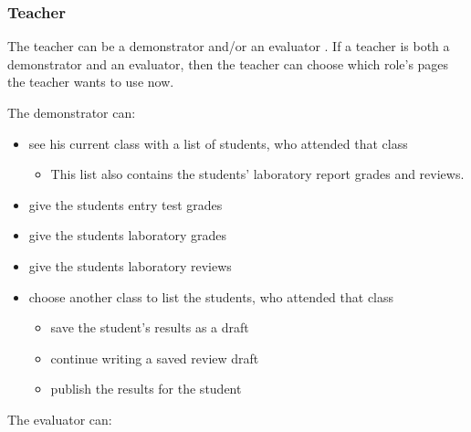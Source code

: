 \subsubsection{Teacher}

The teacher can be a demonstrator and/or an evaluator . If a teacher is both a demonstrator and an evaluator, then the teacher can choose which role's pages the teacher wants to use now.


The demonstrator can:

\begin{itemize}
	\item see his current class with a list of students, who attended that class
	\begin{itemize}
		\item This list also contains the students' laboratory report grades and reviews.
	\end{itemize}
	\item give the students entry test grades
	\item give the students laboratory grades
	\item give the students laboratory reviews
	\item choose another class to list the students, who attended that class
	\begin{itemize}
		\item save the student's results as a draft
		\item continue writing a saved review draft
		\item publish the results for the student
	\end{itemize}
\end{itemize}


The evaluator can:

